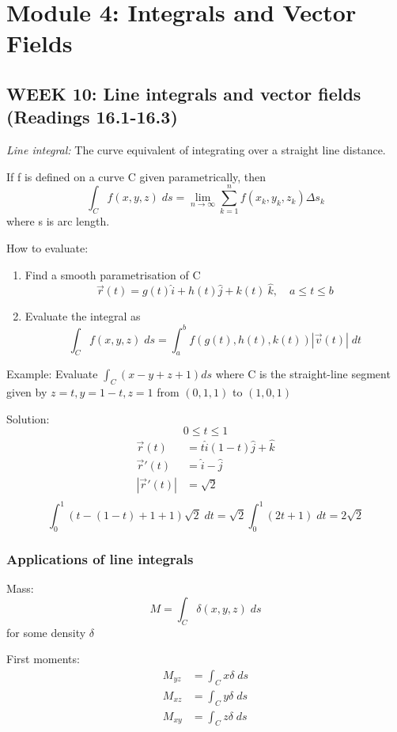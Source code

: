 \documentclass[12pt]{article}
\begin{document}
\section{Module 4: Integrals and Vector Fields}
\subsection{WEEK 10: Line integrals and vector fields (Readings 16.1-16.3)}
\emph{Line integral:} The curve equivalent of integrating over a straight line distance.

If f is defined on a curve C given parametrically, then 
\[\int_C f(x,y,z) \; ds = \lim_{n\to \infty} \sum_{k=1}^n f(x_k, y_k, z_k) \Delta s_k\]
where s is arc length.

How to evaluate:
\begin{enumerate}
    \item Find a smooth parametrisation of C
    \[\vec{r}(t) = g(t) \hat{i} + h(t) \hat{j} + k(t)\ \hat{k}, \quad a \leq t \leq b\]
    \item Evaluate the integral as
    \[\int_C f(x,y,z) \; ds = \int_a^b f(g(t), h(t), k(t)) \left|\vec{v}(t)\right| \; dt\]
\end{enumerate}

Example: Evaluate $\int_C (x-y+z+1) ds$ where C is the straight-line segment given by $z=t, y=1-t, z=1$ from $(0,1,1)$ to $(1,0,1)$

Solution:
\[0 \leq t \leq 1\]
\begin{align*}
    \vec{r}(t) &= t \hat{i} (1-t) \hat{j} + \hat{k}\\
    \vec{r}'(t) &= \hat{i} - \hat{j}\\
    |\vec{r}'(t)| &= \sqrt{2}\\
\end{align*}
\[\int_0^1 (t- (1-t) + 1 + 1) \sqrt{2}\; dt = \sqrt{2} \int_0^1 (2t+1) \; dt = 2\sqrt{2}\]

\subsubsection{Applications of line integrals}
Mass:
\[M = \int_C \delta(x,y,z) \; ds\]
for some density $\delta$

First moments:
\begin{align*}
    M_{yz} &= \int_C x \delta \; ds\\
    M_{xz} &= \int_C y \delta \; ds\\
    M_{xy} &= \int_C z \delta \; ds\\
\end{align*}
\end{document}
